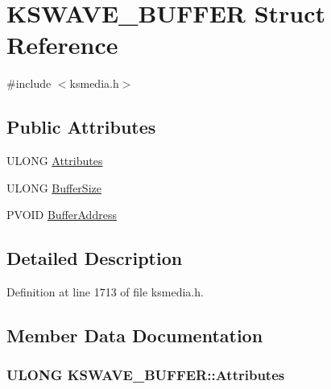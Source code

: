 \hypertarget{struct_k_s_w_a_v_e___b_u_f_f_e_r}{}\section{K\+S\+W\+A\+V\+E\+\_\+\+B\+U\+F\+F\+ER Struct Reference}
\label{struct_k_s_w_a_v_e___b_u_f_f_e_r}


{\ttfamily \#include $<$ksmedia.\+h$>$}

\subsection*{Public Attributes}
\begin{DoxyCompactItemize}
\item 
U\+L\+O\+NG \hyperlink{struct_k_s_w_a_v_e___b_u_f_f_e_r_a87f7dc8fb5a5aac76c739249a33c426f}{Attributes}
\item 
U\+L\+O\+NG \hyperlink{struct_k_s_w_a_v_e___b_u_f_f_e_r_a7fe228703c11f73a581366e720a73984}{Buffer\+Size}
\item 
P\+V\+O\+ID \hyperlink{struct_k_s_w_a_v_e___b_u_f_f_e_r_a07ab9f1bc09790b462c1742d8399c1e1}{Buffer\+Address}
\end{DoxyCompactItemize}


\subsection{Detailed Description}


Definition at line 1713 of file ksmedia.\+h.



\subsection{Member Data Documentation}
\subsubsection[{\texorpdfstring{Attributes}{Attributes}}]{\setlength{\rightskip}{0pt plus 5cm}U\+L\+O\+NG K\+S\+W\+A\+V\+E\+\_\+\+B\+U\+F\+F\+E\+R\+::\+Attributes}\hypertarget{struct_k_s_w_a_v_e___b_u_f_f_e_r_a87f7dc8fb5a5aac76c739249a33c426f}{}\label{struct_k_s_w_a_v_e___b_u_f_f_e_r_a87f7dc8fb5a5aac76c739249a33c426f}


